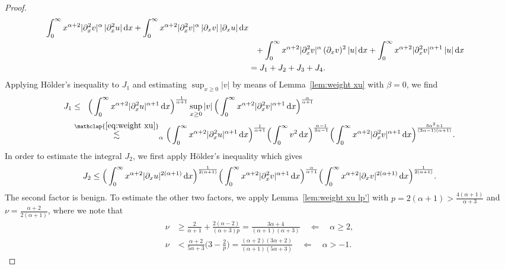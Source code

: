 \documentclass[reqno,12pt]{amsart}
\renewcommand{\d}{\ensuremath{\mathrm{d}}}
\renewcommand{\d}{\ensuremath{{\rm d}}}
\numberwithin{equation}{section}
\begin{document}
\begin{proof}
\begin{align}
    \int_0^\infty x^{\alpha+2} 
    |\partial_x^2 v|^\alpha\, |\partial_x^2 u|\, \d x 
    + 
    \int_0^\infty x^{\alpha+2} 
    |\partial_x^2 v|^\alpha\, |\partial_x v|\, |\partial_x u|\, \d x 
    \nonumber\\
    & \phantom{=} 
    +
    \int_0^\infty x^{\alpha+2} |\partial_x^2 v|^\alpha\, (\partial_x v)^2\, |u|\, \d x
    + 
    \int_0^\infty x^{\alpha+2} |\partial_x^2 v|^{\alpha+1}\, |u|\, \d x
    \nonumber\\
    &=
    J_1 + J_2 + J_3 + J_4. \label{eq:N(v)u_J_i}
\end{align}
%
Applying H\"older's inequality to $J_1$ and estimating $\sup_{x\geq 0} |v|$ by means of Lemma~\ref{lem:weight xu} with $\beta=0$, we find
%
\begin{align}\nonumber
    J_1 
    &\leq_{\phantom{\alpha}} 
    \Big(\int_0^\infty x^{\alpha+2} |\partial_x^2 u|^{\alpha+1}\, \d x\Big)^\frac{1}{\alpha+1} \sup_{x \geq 0} |v|\, \Big(\int_0^\infty x^{\alpha+2} |\partial_x^2 v|^{\alpha+1}\, \d x\Big)^\frac{\alpha}{\alpha+1}
    \\
    &\stackrel{\mathclap{\eqref{eq:weight xu}}}{\lesssim}_\alpha 
    \Big(\int_0^\infty x^{\alpha+2} |\partial_x^2 u|^{\alpha+1}\, \d x\Big)^\frac{1}{\alpha+1}
    \Big(\int_0^\infty v^2\, \d x\Big)^\frac{\alpha-1}{3\alpha-1}
    \Big(\int_0^\infty x^{\alpha+2} |\partial_x^2 v|^{\alpha+1}\, \d x\Big)^\frac{3\alpha^2+1}{(3\alpha-1)(\alpha+1)}. \label{eq:N(v)u_J1}
\end{align}
%
In order to estimate the integral $J_2$, we first apply H\"older's inequality which gives
%
\begin{equation*}
    J_2
    \leq
    \Big(\int_0^\infty x^{\alpha+2} |\partial_x u|^{2(\alpha+1)}\, \d x\Big)^\frac{1}{2(\alpha+1)}
    \Big(\int_0^\infty x^{\alpha+2} |\partial_x^2 v|^{\alpha+1}\, \d x\Big)^\frac{\alpha}{\alpha+1} 
    \Big(\int_0^\infty x^{\alpha+2} |\partial_x v|^{2(\alpha+1)}\, \d x\Big)^\frac{1}{2(\alpha+1)}.
\end{equation*}
%
The second factor is benign. To estimate the other two factors, we apply Lemma~\ref{lem:weight xu lp'} with $p = 2(\alpha+1) > \frac{4(\alpha+1)}{\alpha+3}$ and $\nu = \frac{\alpha+2}{2(\alpha+1)}$, where we note that
%
\begin{align*}
\nu &\ge \frac{2}{\alpha+1} + \frac{2(\alpha-2)}{(\alpha+3)p} = \frac{3\alpha+4}{(\alpha+1)(\alpha+3)} \quad \Longleftarrow \quad \alpha \ge 2, \\
\nu &< \frac{\alpha+2}{5\alpha+3} \big(3-\tfrac 2 p\big) = \frac{(\alpha+2)(3\alpha+2)}{(\alpha+1)(5\alpha+3)} \quad \Longleftarrow \quad \alpha > -1.

\end{align*}
\end{proof}
\end{document}
